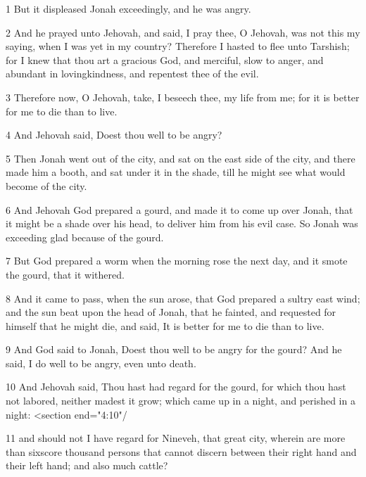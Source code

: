 \par 1 But it displeased Jonah exceedingly, and he was angry.
\par 2 And he prayed unto Jehovah, and said, I pray thee, O Jehovah, was not this my saying, when I was yet in my country? Therefore I hasted to flee unto Tarshish; for I knew that thou art a gracious God, and merciful, slow to anger, and abundant in lovingkindness, and repentest thee of the evil.
\par 3 Therefore now, O Jehovah, take, I beseech thee, my life from me; for it is better for me to die than to live.
\par 4 And Jehovah said, Doest thou well to be angry?
\par 5 Then Jonah went out of the city, and sat on the east side of the city, and there made him a booth, and sat under it in the shade, till he might see what would become of the city.
\par 6 And Jehovah God prepared a gourd, and made it to come up over Jonah, that it might be a shade over his head, to deliver him from his evil case. So Jonah was exceeding glad because of the gourd.
\par 7 But God prepared a worm when the morning rose the next day, and it smote the gourd, that it withered.
\par 8 And it came to pass, when the sun arose, that God prepared a sultry east wind; and the sun beat upon the head of Jonah, that he fainted, and requested for himself that he might die, and said, It is better for me to die than to live.
\par 9 And God said to Jonah, Doest thou well to be angry for the gourd? And he said, I do well to be angry, even unto death.
\par 10 And Jehovah said, Thou hast had regard for the gourd, for which thou hast not labored, neither madest it grow; which came up in a night, and perished in a night: <section end="4:10"/
\par 11 and should not I have regard for Nineveh, that great city, wherein are more than sixscore thousand persons that cannot discern between their right hand and their left hand; and also much cattle?

